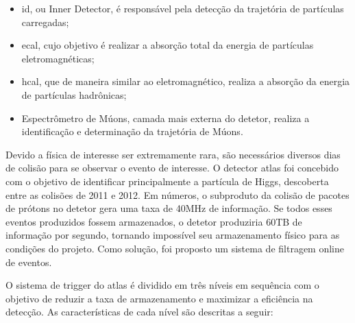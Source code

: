 \begin{itemize}
\item \gls{id}, ou Inner Detector, é responsável pela detecção da trajetória de partículas carregadas;
\item \gls{ecal}, cujo objetivo é realizar a absorção total da energia de partículas eletromagnéticas;
\item \gls{hcal}, que de maneira similar ao eletromagnético, realiza a absorção da energia de partículas hadrônicas;
\item Espectrômetro de Múons, camada mais externa do detetor, realiza  a identificação e determinação da trajetória de Múons.
\end{itemize}

Devido a física de interesse ser extremamente rara, são necessários diversos dias de colisão para se
observar o evento de interesse. O detector  \gls{atlas}  foi concebido com o objetivo de identificar
principalmente a partícula de Higgs, descoberta entre as colisões de 2011 e 2012. Em números,
o subproduto da colisão de pacotes de prótons no detetor gera uma taxa de 40MHz de informação.
Se todos esses eventos produzidos fossem armazenados, o detetor produziria 60TB de informação
por segundo, tornando impossível seu armazenamento físico para as condições do projeto. Como 
solução, foi proposto um sistema de filtragem online de eventos.

O sistema de trigger do  \gls{atlas} é dividido em três níveis em sequência com o objetivo de reduzir
a taxa de armazenamento e maximizar a eficiência na detecção. As características de cada nível são
descritas a seguir:


